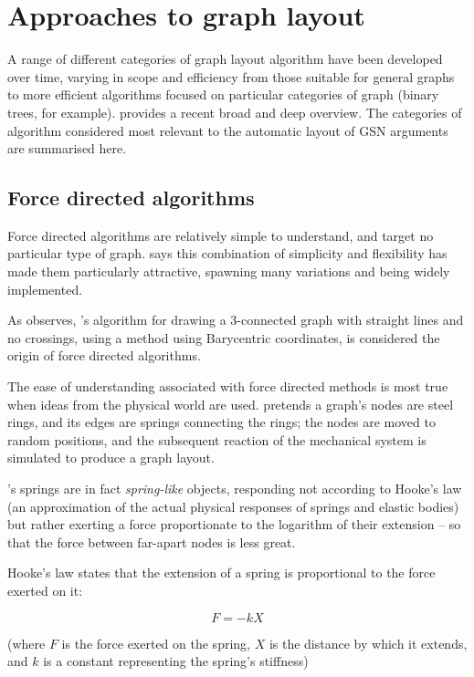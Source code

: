 \section{Approaches to graph layout}

A range of different categories of graph layout algorithm have been developed over time,
varying in scope and efficiency from those suitable for general graphs to more efficient algorithms focused on particular categories of graph (binary trees, for example).
\citet{handbook} provides a recent broad and deep overview.
The categories of algorithm considered most relevant to the automatic layout of GSN arguments are summarised here.



\subsection{Force directed algorithms \label{sec:forcedir}}

Force directed algorithms are relatively simple to understand, and target no particular type of graph.
\citet{handbook:forcedir} says this combination of simplicity and flexibility has made them particularly attractive,
spawning many variations and being widely implemented.

As \citet{handbook:forcedir} observes, \citet{tutte}'s algorithm for drawing a 3-connected graph with straight lines and no crossings, using a method using Barycentric coordinates, is considered the origin of force directed algorithms.

The ease of understanding associated with force directed methods is most true when ideas from the physical world are used. \citet{eades84} pretends a graph's nodes are steel rings, and its edges are springs connecting the rings; the nodes are moved to random positions, and the subsequent reaction of the mechanical system is simulated to produce a graph layout.

\citeauthor{eades84}'s springs are in fact \emph{spring-like} objects, responding not according to Hooke's law (an approximation of the actual physical responses of springs and elastic bodies) but rather exerting a force proportionate to the logarithm of their extension -- so that the force between far-apart nodes is less great.

Hooke's law states that the extension of a spring is proportional to the force exerted on it:

$$
F = -kX
$$

(where $F$ is the force exerted on the spring,
$X$ is the distance by which it extends,
and $k$ is a constant representing the spring's stiffness)

